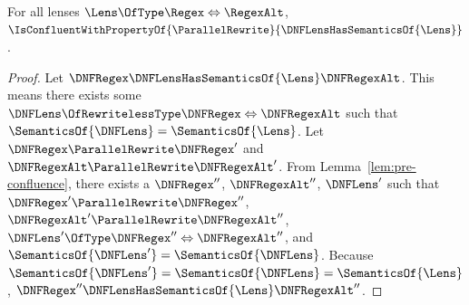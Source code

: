 \documentclass[sigplan,acmsmall]{acmart}
\begin{document}
\begin{theorem}
  \label{thm:parallel_confluence_noswap}
  For all lenses $\Lens \OfType \Regex \Leftrightarrow \RegexAlt$,
  $\IsConfluentWithPropertyOf{\ParallelRewrite}{\DNFLensHasSemanticsOf{\Lens}}$.
\end{theorem}
\begin{proof}
  Let $\DNFRegex \DNFLensHasSemanticsOf{\Lens} \DNFRegexAlt$.
  This means there exists some $\DNFLens \OfRewritelessType \DNFRegex
  \Leftrightarrow \DNFRegexAlt$ such that $\SemanticsOf{\DNFLens} =
  \SemanticsOf{\Lens}$.
  Let $\DNFRegex \ParallelRewrite \DNFRegex'$ and $\DNFRegexAlt \ParallelRewrite
  \DNFRegexAlt'$.  From Lemma~\ref{lem:pre-confluence}, there exists a
  $\DNFRegex''$, $\DNFRegexAlt''$, $\DNFLens'$ such that $\DNFRegex'
  \ParallelRewrite
  \DNFRegex''$, $\DNFRegexAlt' \ParallelRewrite \DNFRegexAlt''$, $\DNFLens'
  \OfType
  \DNFRegex'' \Leftrightarrow \DNFRegexAlt''$, and $\SemanticsOf{\DNFLens'} =
  \SemanticsOf{\DNFLens}$.  Because $\SemanticsOf{\DNFLens'} =
  \SemanticsOf{\DNFLens} = \SemanticsOf{\Lens}$, $\DNFRegex''
  \DNFLensHasSemanticsOf{\Lens} \DNFRegexAlt''$.
\end{proof}
\end{document}
